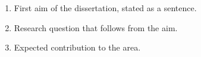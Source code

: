 
\begin{enumerate}
\item First aim of the dissertation, stated as a sentence.
\item Research question that follows from the aim.
\item Expected contribution to the area.
\end{enumerate}
